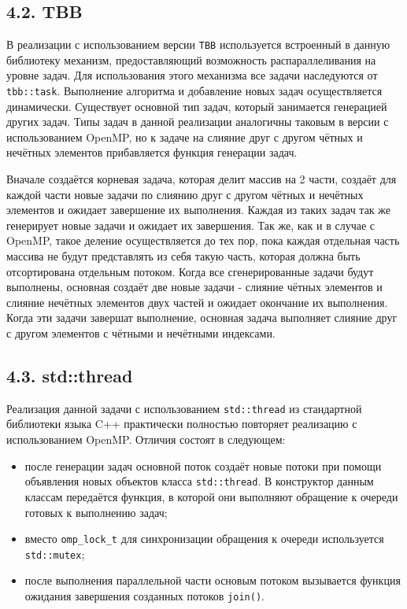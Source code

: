\documentclass{report}
\begin{document}
    \subsection*{4.2. TBB}
    \par В реализации с использованием версии \verb|TBB| используется встроенный в данную библиотеку механизм, предоставляющий возможность распараллеливания на уровне задач. Для использования этого механизма все задачи наследуются от \verb|tbb::task|. Выполнение алгоритма и добавление новых задач осуществляется динамически. Существует основной тип задач, который занимается генерацией других задач.
    Типы задач в данной реализации аналогичны таковым в версии с использованием OpenMP, но к задаче на слияние друг с другом чётных и нечётных элементов прибавляется функция генерации задач.
    \par Вначале создаётся корневая задача, которая делит массив на 2 части, создаёт для каждой части новые задачи по слиянию друг с другом чётных и нечётных элементов и ожидает завершение их выполнения. Каждая из таких задач так же генерирует новые задачи и ожидает их завершения. Так же, как и в случае с OpenMP, такое деление осуществляется до тех пор, пока каждая отдельная часть массива не будут представлять из себя такую часть, которая должна быть отсортирована отдельным потоком. Когда все сгенерированные задачи будут выполнены, основная создаёт две новые задачи - слияние чётных элементов и слияние нечётных элементов двух частей и ожидает окончание их выполнения. Когда эти задачи завершат выполнение, основная задача выполняет слияние друг с другом элементов с чётными и нечётными индексами.

    \subsection*{4.3. std::thread}
    Реализация данной задачи с использованием \verb|std::thread| из стандартной библиотеки языка C++ практически полностью повторяет реализацию с использованием OpenMP. Отличия состоят в следующем:
    \begin{itemize}
        \item после генерации задач основной поток создаёт новые потоки при помощи объявления новых объектов класса \verb|std::thread|. В конструктор данным классам передаётся функция, в которой они выполняют обращение к очереди готовых к выполнению задач;
        \item вместо \verb|omp_lock_t| для синхронизации обращения к очереди используется \verb|std::mutex|;
        \item после выполнения параллельной части основым потоком вызывается функция ожидания завершения созданных потоков \verb|join()|.
    \end{itemize}
\end{document}
